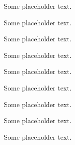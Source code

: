 \documentclass[letterpaper]{resume}
\begin{document}
\begin{minipage}[t]{0.66\textwidth}
\sectionspace %


\begin{tightitemize}
\item Some placeholder text.
\item Some placeholder text.
\item Some placeholder text.
\end{tightitemize}

\sectionspace %


\begin{tightitemize}
\item Some placeholder text.
\item Some placeholder text.
\item Some placeholder text.
\end{tightitemize}

\sectionspace %


\begin{tightitemize}
\item Some placeholder text.
\item Some placeholder text.
\item Some placeholder text.
\end{tightitemize}

\sectionspace %


\end{minipage} %
\end{document}
